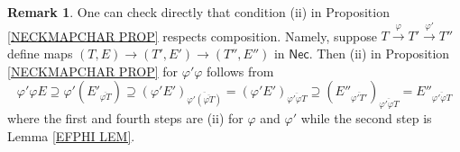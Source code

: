\documentclass[a4paper,10pt
,draft
]{article}%
\numberwithin{equation}{section}
\numberwithin{figure}{section}
\theoremstyle{definition} %
\newtheorem{remark}[equation]{Remark}%
\newcommand{\1}{\ensuremath{\mathbbm 1}}%
\begin{document}
\begin{remark}
One can check directly that 
condition (ii) in Proposition \ref{NECKMAPCHAR PROP}
respects composition.
Namely, suppose $T \xrightarrow{\varphi} T' \xrightarrow{\varphi'} T''$
define maps
$(T,E) \to (T',E') \to (T'',E'')$
in $\mathsf{Nec}$.
Then (ii) in Proposition \ref{NECKMAPCHAR PROP}
for $\varphi' \varphi$
follows from  
\[
\varphi' \varphi E
	\supseteq
\varphi'
\left(E'_{\overline{\varphi T}}\right)
	\supseteq
\left(\varphi' E'\right)_
{\overline{\varphi' (\overline{\varphi T})}}
	=
\left(\varphi' E'\right)_
{\overline{\varphi' \varphi T}}
	\supseteq
\left(
E''_{\overline{\varphi' T'}}\right)_
{\overline{\varphi' \varphi T}}
	=
E''_{\overline{\varphi' \varphi T}}
\]
where the first and fourth steps are 
(ii) for $\varphi$ and $\varphi'$
while the second step is Lemma \ref{EFPHI LEM}.
\end{remark}
\end{document}
